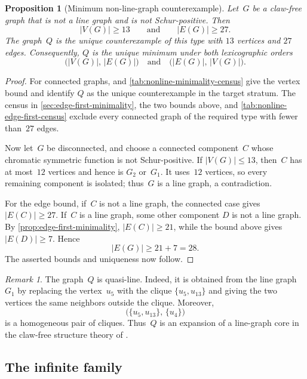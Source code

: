 \documentclass[11pt]{amsart}
\numberwithin{equation}{section}
\newtheorem{proposition}[lemma]{Proposition}
\theoremstyle{remark}
\newtheorem{remark}[lemma]{Remark}
\newcommand{\Gtwo}{G_{2}}
\newcommand{\Gone}{G_{1}}
\begin{document}
\begin{proposition}[Minimum non-line-graph counterexample]
\label{prop:nonline-minimality}
Let~$G$ be a claw-free graph that is not a line graph and is not
Schur-positive.  Then
\[
\lvert V(G)\rvert\ge13
\qquad\text{and}\qquad
\lvert E(G)\rvert\ge27.
\]
The graph~$Q$ is the unique counterexample of this type with $13$
vertices and $27$ edges.  Consequently, $Q$ is the unique minimum under
both lexicographic orders
\[
\bigl(\lvert V(G)\rvert,\,\lvert E(G)\rvert\bigr)
\quad\text{and}\quad
\bigl(\lvert E(G)\rvert,\,\lvert V(G)\rvert\bigr).
\]
\end{proposition}

\begin{proof}
For connected graphs, \citet[Proposition~4]{Prajapati2026} and
\cref{tab:nonline-minimality-census} give the vertex bound and identify
$Q$ as the unique counterexample in the target stratum.  The census in
\cref{sec:edge-first-minimality}, the two bounds above, and
\cref{tab:nonline-edge-first-census} exclude every connected graph of the
required type with fewer than~$27$ edges.

Now let~$G$ be disconnected, and choose a connected component~$C$ whose
chromatic symmetric function is not Schur-positive.  If
$\lvert V(G)\rvert\le13$, then~$C$ has at most~$12$ vertices and hence is
$\Gtwo$ or~$\Gone$.  It uses~$12$ vertices, so every remaining component
is isolated; thus~$G$ is a line graph, a contradiction.

For the edge bound, if~$C$ is not a line graph, the connected case gives
$\lvert E(C)\rvert\ge27$.  If~$C$ is a line graph, some other component
$D$ is not a line graph.  By \cref{prop:edge-first-minimality},
$\lvert E(C)\rvert\ge21$, while the bound above gives
$\lvert E(D)\rvert\ge7$.  Hence
\[
\lvert E(G)\rvert\ge21+7=28.
\]
The asserted bounds and uniqueness now follow.
\end{proof}

\begin{remark}\label{rem:Q-structure}
The graph~$Q$ is quasi-line.  Indeed, it is obtained from the line
graph~$\Gone$ by replacing the vertex~$u_5$ with the clique
$\{u_5,u_{13}\}$ and giving the two vertices the same neighbors outside
the clique.  Moreover,
\[
\bigl(\{u_5,u_{13}\},\,\{u_4\}\bigr)
\]
is a homogeneous pair of cliques.  Thus~$Q$ is an expansion of a line-graph core in the claw-free structure theory of
\citet{ChudnovskySeymour2005}.
\end{remark}

\subsection{The infinite family}
\label{subsec:nonline-infinite-family}
\end{document}
